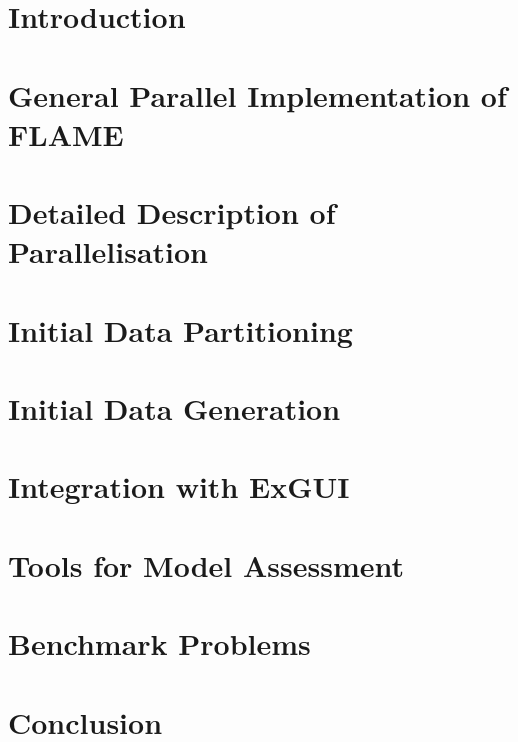 \documentclass[a4paper,11pt]{article}
\begin{document}
\section{Introduction}	
\section{General Parallel Implementation of FLAME} 
\section{Detailed Description of Parallelisation} 
\section{Initial Data Partitioning} 
\section{Initial Data Generation} 
\section{Integration with ExGUI} 
\section{Tools for Model Assessment} 
\section{Benchmark Problems} 
\section{Conclusion} 

\newpage
\appendix 

\end{document}
